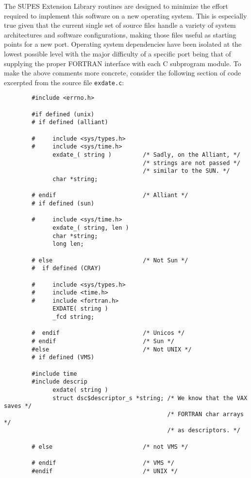 The SUPES Extension Library routines are designed to minimize the
effort required to implement this software on a new operating system.
This is especially true given that the current single set of source files handle
a variety of system architectures and software configurations,
making those files useful as starting points for a new port.
Operating system dependencies have
been isolated at the lowest possible level with the major difficulty
of a specific port being that of supplying the proper FORTRAN interface
with each C subprogram module.
To make the above comments more concrete,
consider the following section of code excerpted from the source
file \verb+exdate.c+:
\begin{verbatim}
        #include <errno.h>
        
        #if defined (unix)
        # if defined (alliant)
        
        #     include <sys/types.h>
        #     include <sys/time.h>
              exdate_( string )         /* Sadly, on the Alliant, */
                                        /* strings are not passed */
                                        /* similar to the SUN. */
              char *string;
        
        # endif                         /* Alliant */
        # if defined (sun)
        
        #     include <sys/time.h>
              exdate_( string, len )
              char *string;
              long len;
        
        # else                          /* Not Sun */
        #  if defined (CRAY)
        
        #     include <sys/types.h>
        #     include <time.h>
        #     include <fortran.h>
              EXDATE( string )
              _fcd string;
        
        #  endif                        /* Unicos */
        # endif                         /* Sun */
        #else                           /* Not UNIX */
        # if defined (VMS)
        
        #include time
        #include descrip
              exdate( string )
              struct dsc$descriptor_s *string; /* We know that the VAX saves */
                                               /* FORTRAN char arrays */
                                               /* as descriptors. */
        
        # else                          /* not VMS */

        # endif                         /* VMS */
        #endif                          /* UNIX */
\end{verbatim}		
